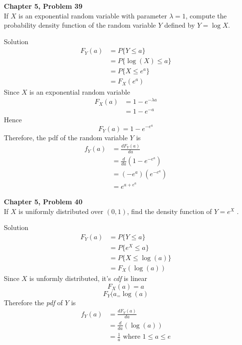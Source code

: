 \documentclass{article}
\begin{document}
\begin{spacing}{1.1}
\newpage
\begin{homeworkProblem}
  {\bf Chapter 5, Problem 39}\\
  If $X$ is an exponential random variable with parameter $\lambda = 1$,
  compute the probability density function of the random variable $Y$ 
  defined by $Y = \log X$.
  \begin{homeworkSection}{Solution}
    \begin{align*}
      F_Y( a) &= P\{ Y \le a\} \\
              &= P\{ \log( X) \le a\} \\
              &= P\{ X \le e^a\} \\
              &= F_X( e^a)
    \end{align*}
    Since $X$ is an exponential random variable
    \begin{align*}
      F_X( a) &= 1 - e^{-\lambda a} \\
              &= 1 - e^{-a}
    \end{align*}
    Hence
    \[F_Y( a) = 1 - e^{-e^a}\]
    Therefore, the pdf of the random variable $Y$ is
    \begin{align*}
      f_Y( a) &= \frac{ d F_Y( a)}{ d a} \\
              &= \frac{ d}{ da}( 1 - e^{-e^a}) \\
              &= (-e^a) (e^{-e^a}) \\
              &= e^{a + e^a}
    \end{align*}
  \end{homeworkSection}
\end{homeworkProblem}

\newpage
\begin{homeworkProblem}
  {\bf Chapter 5, Problem 40}\\
  If $X$ is uniformly distributed over $(0, 1)$, find the density 
  function of $Y = e^X$ .
  \begin{homeworkSection}{Solution}
    \begin{align*}
      F_Y( a) &= P\{ Y \le a\}\\
              &= P\{ e^X \le a\}\\
              &= P\{ X \le \log( a)\}\\
              &= F_X( \log( a))
    \end{align*}
    Since $X$ is unformly distributed, it's \emph{cdf} is linear 
    \[F_X( a) = a\]
    \[F_Y( a_ = \log( a)\]
    Therefore the \emph{pdf} of $Y$ is
    \begin{align*}
      f_Y( a) &= \frac{ d F_Y( a)}{ d a}\\ 
              &= \frac{ d}{ da} ( \log( a))\\
              &= \frac{ 1}{ a} \text{ where } 1 \le a \le e
    \end{align*}
  \end{homeworkSection}
\end{homeworkProblem}


\end{spacing}
\end{document}
